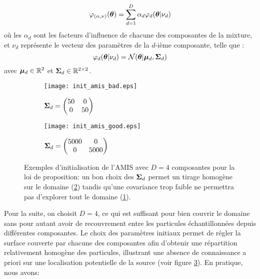 \begin{equation}
\varphi_{(\alpha,\nu)}({\bm{\theta}}) = \sum\limits_{d=1}^D \alpha_d \varphi_d({\bm{\theta}} | \nu_d)
\label{eq_AE_21}
\end{equation}
où les $\alpha_d$ sont les facteurs d'influence de chacune des composantes de la mixture, et $\nu_d$ représente le vecteur des paramètres de la $d$-ième composante, telle que : 
\begin{equation}
\varphi_d({\bm{\theta}} | \nu_d) = \mathcal{N}({\bm{\theta}} | {\bm{\mu}}_d, {\bm{\Sigma}}_d)
\label{eq_AE_21_bis}
\end{equation}
avec ${\bm{\mu}}_d \in \mathbb{R}^2$ et ${\bm{\Sigma}}_d \in \mathbb{R}^{2\times2}$.

 \begin{figure}[h!]
 	\centering
 	\begin{subfigure}[t]{0.5\textwidth}
 		\centering
 		\texttt{[image: init\_amis\_bad.eps]}
 		\caption{${\bm{\Sigma}}_d = 
 			\begin{pmatrix}
 			50 & 0 \\
 			0 & 50
 			\end{pmatrix}$}
 		\label{init_amis_bad}
 	\end{subfigure}%
 	\begin{subfigure}[t]{0.5\textwidth}
 		\centering
 		\texttt{[image: init\_amis\_good.eps]}
 		\caption{${\bm{\Sigma}}_d = 
 			\begin{pmatrix}
 			5000 & 0 \\
 			0 & 5000
 			\end{pmatrix}$}
 		\label{init_amis_good}
 	\end{subfigure}
 	\caption{Exemples d'initialisation de l'AMIS avec $D=4$ composantes pour la loi de proposition: un bon choix des ${\bm{\Sigma}}_d$ permet un tirage homogène sur le domaine (\ref{init_amis_good}) tandis qu'une covariance trop faible ne permettra pas d'explorer tout le domaine (\ref{init_amis_bad}).}
 	 \label{fig_init_amis}	
 \end{figure}
 
  Pour la suite, on choisit $D=4$, ce qui est suffisant pour bien couvrir le domaine sans pour autant avoir de recouvrement entre les particules échantillonnées depuis différentes composantes. Le choix des paramètres initiaux permet de régler la surface couverte par chacune des composantes afin d'obtenir une répartition relativement homogène des particules, illustrant une absence de connaissance a priori sur une localisation potentielle de la source (voir figure \ref{fig_init_amis}). En pratique, nous avons:
  
